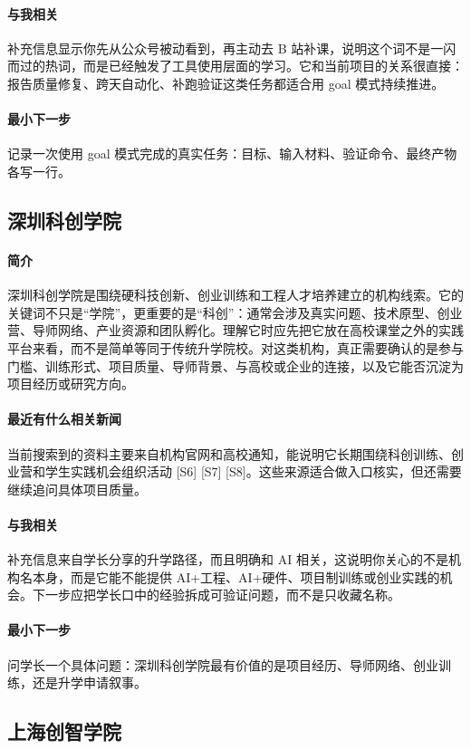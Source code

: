 \documentclass[UTF8,zihao=-4]{ctexart}
\begin{document}
\paragraph{与我相关} 补充信息显示你先从公众号被动看到，再主动去 B 站补课，说明这个词不是一闪而过的热词，而是已经触发了工具使用层面的学习。它和当前项目的关系很直接：报告质量修复、跨天自动化、补跑验证这类任务都适合用 goal 模式持续推进。
\paragraph{最小下一步} 记录一次使用 goal 模式完成的真实任务：目标、输入材料、验证命令、最终产物各写一行。
\subsection*{深圳科创学院}
\paragraph{简介} 深圳科创学院是围绕硬科技创新、创业训练和工程人才培养建立的机构线索。它的关键词不只是“学院”，更重要的是“科创”：通常会涉及真实问题、技术原型、创业营、导师网络、产业资源和团队孵化。理解它时应先把它放在高校课堂之外的实践平台来看，而不是简单等同于传统升学院校。对这类机构，真正需要确认的是参与门槛、训练形式、项目质量、导师背景、与高校或企业的连接，以及它能否沉淀为项目经历或研究方向。
\paragraph{最近有什么相关新闻} 当前搜索到的资料主要来自机构官网和高校通知，能说明它长期围绕科创训练、创业营和学生实践机会组织活动 [S6] [S7] [S8]。这些来源适合做入口核实，但还需要继续追问具体项目质量。
\paragraph{与我相关} 补充信息来自学长分享的升学路径，而且明确和 AI 相关，这说明你关心的不是机构名本身，而是它能不能提供 AI+工程、AI+硬件、项目制训练或创业实践的机会。下一步应把学长口中的经验拆成可验证问题，而不是只收藏名称。
\paragraph{最小下一步} 问学长一个具体问题：深圳科创学院最有价值的是项目经历、导师网络、创业训练，还是升学申请叙事。
\subsection*{上海创智学院}
\end{document}
